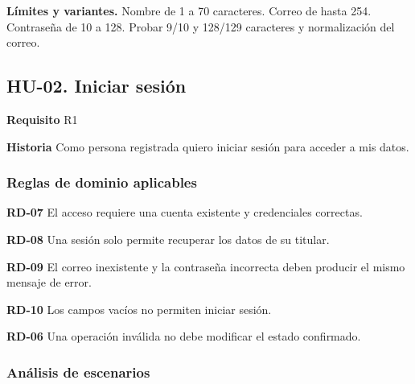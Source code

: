 {\fontsize{9}{11.8}\selectfont\textbf{Límites y variantes.} Nombre de 1 a 70 caracteres. Correo de hasta 254. Contraseña de 10 a 128. Probar 9/10 y 128/129 caracteres y normalización del correo.\par}\vspace{4pt}
\clearpage\subsection*{HU-02. Iniciar sesión}

\textbf{Requisito} R1\par

\textbf{Historia} Como persona registrada quiero iniciar sesión para acceder a mis datos.\par

\subsubsection*{Reglas de dominio aplicables}

\textbf{RD-07} El acceso requiere una cuenta existente y credenciales correctas.\par

\textbf{RD-08} Una sesión solo permite recuperar los datos de su titular.\par

\textbf{RD-09} El correo inexistente y la contraseña incorrecta deben producir el mismo mensaje de error.\par

\textbf{RD-10} Los campos vacíos no permiten iniciar sesión.\par

\textbf{RD-06} Una operación inválida no debe modificar el estado confirmado.\par

\subsubsection*{Análisis de escenarios}

